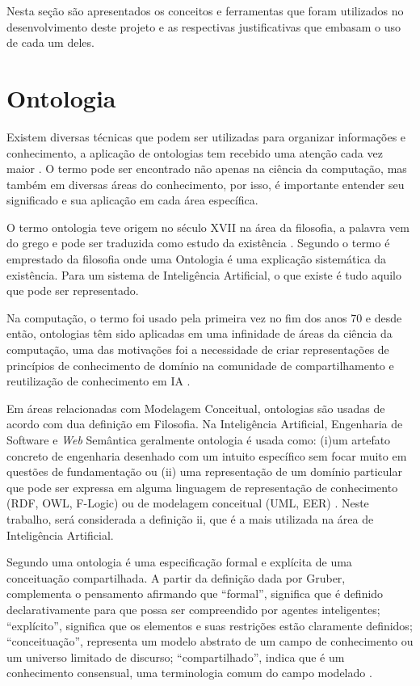 \documentclass{bcc}
\begin{document}
Nesta seção são apresentados os conceitos e ferramentas que foram utilizados no desenvolvimento deste projeto e as respectivas justificativas que embasam o uso de cada um deles.

\section{Ontologia}

Existem diversas técnicas que podem ser utilizadas para organizar informações e conhecimento, a aplicação de ontologias tem recebido uma atenção cada vez maior \cite{almeida2014}. O termo pode ser encontrado não apenas na ciência da computação, mas também em diversas áreas do conhecimento, por isso, é importante entender seu significado e sua aplicação em cada área específica.

O termo ontologia teve origem no século XVII na área da filosofia, a palavra vem do grego e pode ser traduzida como estudo da existência \cite{guizzardi2005}. Segundo \cite{gruber1995} o termo é emprestado da filosofia onde uma Ontologia é uma explicação sistemática da existência. Para um sistema de Inteligência Artificial, o que existe é tudo aquilo que pode ser representado.

Na computação, o termo foi usado pela primeira vez no fim dos anos 70 e desde então, ontologias têm sido aplicadas em uma infinidade de áreas da ciência da computação, uma das motivações foi a necessidade de criar representações de princípios de conhecimento de domínio na comunidade de compartilhamento e reutilização de conhecimento em IA \cite{guizzardi2005}.

Em áreas relacionadas com Modelagem Conceitual, ontologias são usadas de acordo com dua definição em Filosofia. Na Inteligência Artificial, Engenharia de Software e \textit{Web} Semântica geralmente ontologia é usada como: (i)um artefato concreto de engenharia desenhado com um intuito específico sem focar muito em questões de fundamentação ou (ii) uma representação de um domínio particular que pode ser expressa em alguma linguagem de representação de conhecimento (RDF, OWL, F-Logic) ou de modelagem conceitual (UML, EER) \cite{guizzardi2008}. Neste trabalho, será considerada a definição ii, que é a mais utilizada na área de Inteligência Artificial.

Segundo \cite{gruber1995} uma ontologia é uma especificação formal e explícita de uma conceituação compartilhada. A partir da definição dada por Gruber, \cite{rocha2014} complementa o pensamento afirmando que “formal”, significa que é definido declarativamente para que possa ser compreendido por agentes inteligentes; “explícito”, significa que os elementos e suas restrições estão claramente definidos; “conceituação”, representa um modelo abstrato de um campo de conhecimento ou um universo limitado de discurso; “compartilhado”, indica que é um conhecimento consensual, uma terminologia comum do campo modelado \cite{rocha2014}.
\end{document}
